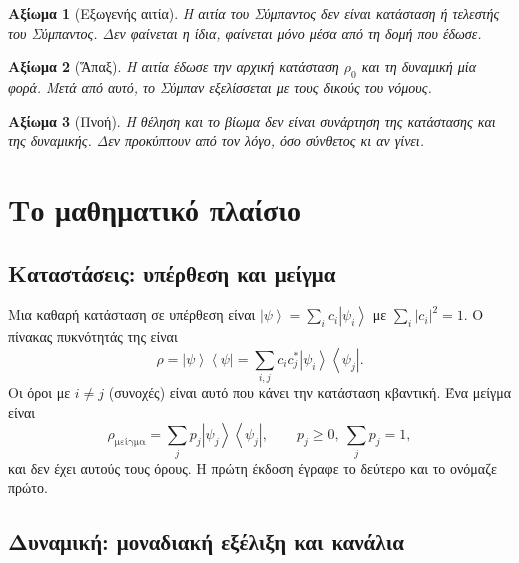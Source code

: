 \documentclass[a4paper,11pt]{article}
\newtheorem{axiom}{Αξίωμα}
\theoremstyle{definition}
\newcommand{\ket}[1]{\left|#1\right\rangle}
\newcommand{\bra}[1]{\left\langle#1\right|}
\begin{document}
\begin{axiom}[Εξωγενής αιτία]
Η αιτία του Σύμπαντος δεν είναι κατάσταση ή τελεστής του Σύμπαντος. Δεν φαίνεται η ίδια, φαίνεται μόνο μέσα από τη δομή που έδωσε.
\end{axiom}

\begin{axiom}[Ἅπαξ]
Η αιτία έδωσε την αρχική κατάσταση $\rho_0$ και τη δυναμική μία φορά. Μετά από αυτό, το Σύμπαν εξελίσσεται με τους δικούς του νόμους.
\end{axiom}

\begin{axiom}[Πνοή]
Η θέληση και το βίωμα δεν είναι συνάρτηση της κατάστασης και της δυναμικής. Δεν προκύπτουν από τον λόγο, όσο σύνθετος κι αν γίνει.
\end{axiom}

\section{Το μαθηματικό πλαίσιο}

\subsection{Καταστάσεις: υπέρθεση και μείγμα}\label{sec:states}

Μια καθαρή κατάσταση σε υπέρθεση είναι $\ket{\psi}=\sum_i c_i\ket{\psi_i}$ με $\sum_i|c_i|^2=1$. Ο πίνακας πυκνότητάς της είναι
\begin{equation}
\rho=\ket{\psi}\bra{\psi}=\sum_{i,j}c_ic_j^*\ket{\psi_i}\bra{\psi_j}.
\end{equation}
Οι όροι με $i\neq j$ (συνοχές) είναι αυτό που κάνει την κατάσταση κβαντική. Ένα μείγμα είναι
\begin{equation}
\rho_{\text{μείγμα}}=\sum_j p_j\ket{\psi_j}\bra{\psi_j},\qquad p_j\ge 0,\ \sum_j p_j=1,
\end{equation}
και δεν έχει αυτούς τους όρους. Η πρώτη έκδοση έγραφε το δεύτερο και το ονόμαζε πρώτο.

\subsection{Δυναμική: μοναδιακή εξέλιξη και κανάλια}
\end{document}
